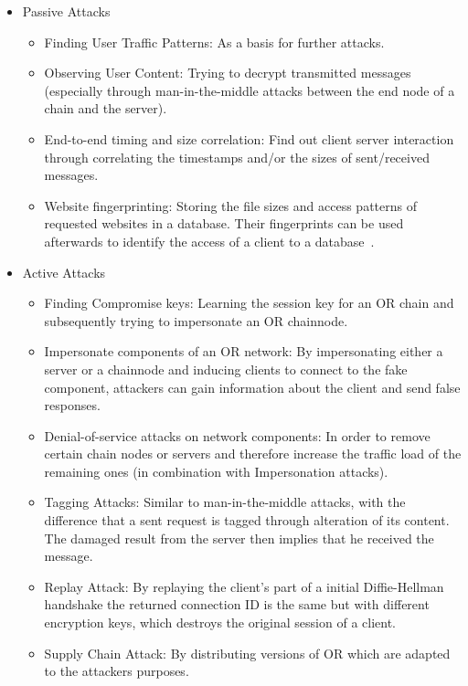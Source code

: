 \documentclass{sig-alternate}
\begin{document}
\begin{description} 
	\begin{itemize} \itemsep0pt 
		\item Passive Attacks
		\begin{itemize} \itemsep0pt 
			\item Finding User Traffic Patterns: As a basis for further attacks.
			\item Observing User Content: Trying to decrypt transmitted messages (especially through man-in-the-middle attacks between the end node of a chain and the server).
			\item End-to-end timing and size correlation: Find out client server interaction through correlating the timestamps and/or the sizes of sent/received messages.
			\item Website fingerprinting: Storing the file sizes and access patterns of requested websites in a database. Their fingerprints can be used afterwards to identify the access of a client to a database~\cite{panchenko2011website}.
		\end{itemize}
		\item Active Attacks
		\begin{itemize} \itemsep0pt 
			\item Finding Compromise keys: Learning the session key for an OR chain and subsequently trying to impersonate an OR chainnode.
			\item Impersonate components of an OR network: By impersonating either a server or a chainnode and inducing clients to connect to the fake component, attackers can gain information about the client and send false responses.
			\item Denial-of-service attacks on network components: In order to remove certain chain nodes or servers and therefore increase the traffic load of the remaining ones (in combination with Impersonation attacks).
			\item Tagging Attacks: Similar to man-in-the-middle attacks, with the difference that a sent request is tagged through alteration of its content. The damaged result from the server then implies that he received the message. 
			\item Replay Attack: By replaying the client's part of a initial Diffie-Hellman handshake the returned connection ID is the same but with different encryption keys, which destroys the original session of a client.
			\item Supply Chain Attack: By distributing versions of OR which are adapted to the attackers purposes. 

\end{itemize}
\end{itemize}
\end{description}
\end{document}
